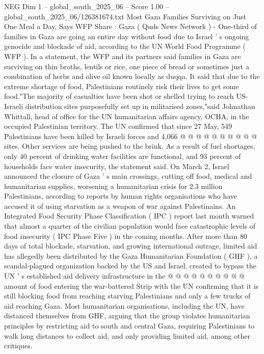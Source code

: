 \begin{textsample}{NEG Dim 1 – global\_south\_2025\_06 – Score 1.00 – global\_south\_2025\_06/126381674.txt}  \label{ex:f1_neg_237}
Most Gaza Families Surviving on Just One Meal a Day, Says WFP Share : Gaza ( Quds News Network ) - One-third of families in Gaza are going an entire day without food due to Israel ' s ongoing genocide and blockade of aid, according to the UN World Food Programme ( WFP ).
In a statement, the WFP and its partners said families in Gaza are surviving on thin broths, lentils or rice, one piece of bread or sometimes just a combination of herbs and olive oil known locally as duqqa.
It said that due to the extreme shortage of food, Palestinians routinely risk their lives to get some food."The majority of casualties have been shot or shelled trying to reach US-Israeli distribution sites purposefully set up in militarised zones,"said Johnathan Whittall, head of office for the UN humanitarian affairs agency, OCHA, in the occupied Palestinian territory.
The UN confirmed that since 27 May, 549 Palestinians have been killed by Israeli forces and 4,066 @ @ @ @ @ @ @ @ @ @ sites.
Other services are being pushed to the brink.
As a result of fuel shortages, only 40 percent of drinking water facilities are functional, and 93 percent of households face water insecurity, the statement said.
On March 2, Israel announced the closure of Gaza ' s main crossings, cutting off food, medical and humanitarian supplies, worsening a humanitarian crisis for 2.3 million Palestinians, according to reports by human rights organisations who have accused it of using starvation as a weapon of war against Palestinains.
An Integrated Food Security Phase Classification ( IPC ) report last month warned that almost a quarter of the civilian population would face catastrophic levels of food insecurity ( IPC Phase Five ) in the coming months.
After more than 80 days of total blockade, starvation, and growing international outrage, limited aid has allegedly been distributed by the Gaza Humanitarian Foundation ( GHF ), a scandal-plagued organization backed by the US and Israel, created to bypass the UN ' s established aid delivery infrastructure in the @ @ @ @ @ @ @ @ @ @ amount of food entering the war-battered Strip with the UN confirming that it is still blocking food from reaching starving Palestinians and only a few trucks of aid reaching Gaza.
Most humanitarian organisations, including the UN, have distanced themselves from GHF, arguing that the group violates humanitarian principles by restricting aid to south and central Gaza, requiring Palestinians to walk long distances to collect aid, and only providing limited aid, among other critiques.

\end{textsample}
